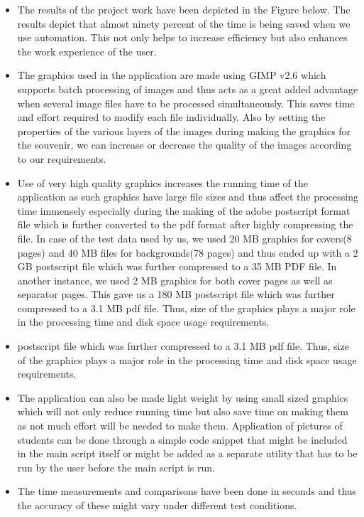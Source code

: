 \begin{itemize}
\item The results of the project work have been depicted in the Figure below. The results depict that almost ninety percent of the time is being saved when we use automation. This not only helps to increase efficiency but also enhances the work experience of the user.
\item The graphics used in the application are made using GIMP v2.6 which supports batch processing of images and thus acts as a great added advantage when several image files have to be processed simultaneously. This saves time and effort required to modify each file individually. Also by setting the properties of the various layers of the images during making the graphics for the souvenir, we can increase or decrease the quality of the images according to our requirements.
\item Use of very high quality graphics increases the running time of the application as such graphics have large file sizes and thus affect the processing time immensely especially during the making of the adobe postscript format file which is further converted to the pdf format after highly compressing the file. In case of the test data used by us, we used 20 MB graphics for covers(8 pages) and 40 MB files for backgrounds(78 pages) and thus ended up with a 2 GB postscript file which was further compressed to a 35 MB PDF file. In another instance, we used 2 MB graphics for both cover pages as well as separator pages. This gave us a 180 MB postscript file which was further compressed to a 3.1 MB pdf file. Thus, size of the graphics plays a major role in the processing time and disk space usage requirements.
\item postscript file which was further compressed to a 3.1 MB pdf file. Thus, size of the graphics plays a major role in the processing time and disk space usage requirements.
\item The application can also be made light weight by using small sized graphics which
will not only reduce running time but also save time on making them as not much effort will be needed to make them. Application of pictures of students can be done through a simple code snippet that might be included in the main script itself or might be added as a separate utility that has to be run by the user before the main script is run.
\item The time measurements and comparisons have been done in seconds and thus the accuracy of these might vary under different test conditions.
\end{itemize}